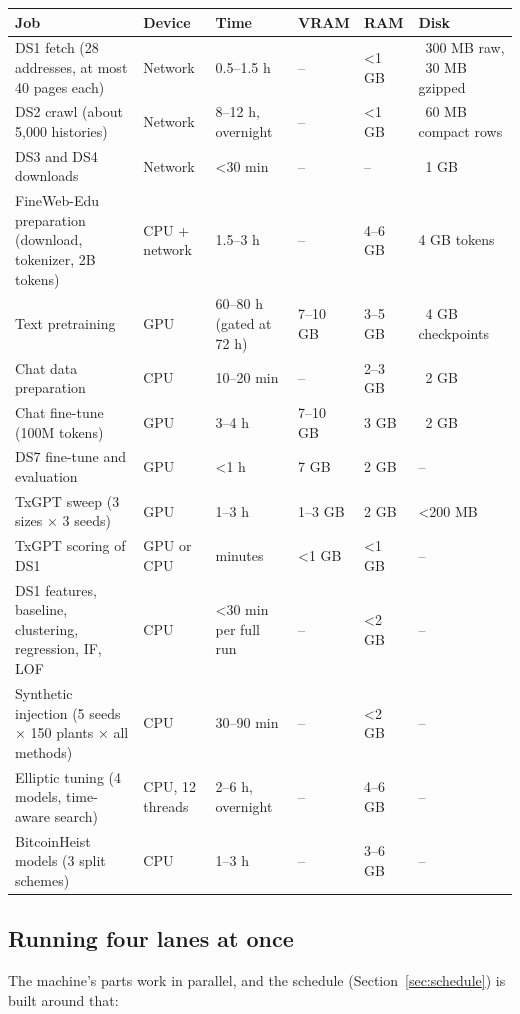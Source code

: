 \begin{longtable}{@{}L{4.4cm}L{1.6cm}L{2.2cm}L{1.5cm}L{1.4cm}L{2.6cm}@{}}
\toprule
\textbf{Job} & \textbf{Device} & \textbf{Time\est{}} & \textbf{VRAM} & \textbf{RAM} & \textbf{Disk} \\
\midrule
\endhead
DS1 fetch (28 addresses, at most 40 pages each) & Network & 0.5--1.5 h & -- & <1 GB & ~300 MB raw, ~30 MB gzipped \\
DS2 crawl (about 5,000 histories) & Network & 8--12 h, overnight & -- & <1 GB & ~60 MB compact rows \\
DS3 and DS4 downloads & Network & <30 min & -- & -- & ~1 GB \\
FineWeb-Edu preparation (download, tokenizer, 2B tokens) & CPU + network & 1.5--3 h & -- & 4--6 GB & 4 GB tokens \\
Text pretraining & GPU & 60--80 h (gated at 72 h) & 7--10 GB & 3--5 GB & ~4 GB checkpoints \\
Chat data preparation & CPU & 10--20 min & -- & 2--3 GB & ~2 GB \\
Chat fine-tune (100M tokens) & GPU & 3--4 h & 7--10 GB & 3 GB & ~2 GB \\
DS7 fine-tune and evaluation & GPU & <1 h & 7 GB & 2 GB & -- \\
TxGPT sweep (3 sizes × 3 seeds) & GPU & 1--3 h & 1--3 GB & 2 GB & <200 MB \\
TxGPT scoring of DS1 & GPU or CPU & minutes & <1 GB & <1 GB & -- \\
DS1 features, baseline, clustering, regression, IF, LOF & CPU & <30 min per full run & -- & <2 GB & -- \\
Synthetic injection (5 seeds × 150 plants × all methods) & CPU & 30--90 min & -- & <2 GB & -- \\
Elliptic tuning (4 models, time-aware search) & CPU, 12 threads & 2--6 h, overnight & -- & 4--6 GB & -- \\
BitcoinHeist models (3 split schemes) & CPU & 1--3 h & -- & 3--6 GB & -- \\
\bottomrule
\end{longtable}

\subsection{Running four lanes at once}

The machine's parts work in parallel, and the schedule (Section~\ref{sec:schedule}) is built
around that:


